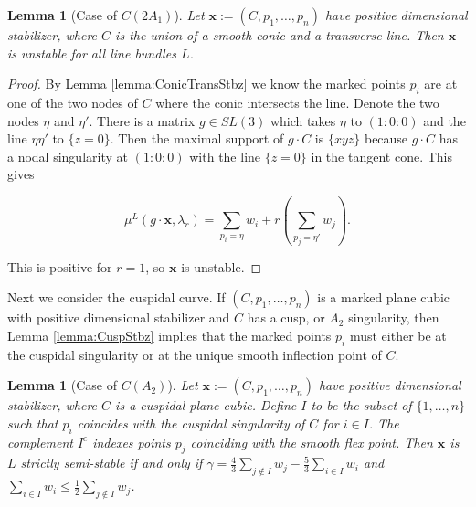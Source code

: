 \documentclass{amsart}
\numberwithin{equation}{section}
\newtheorem{lemma}[prop]{Lemma}
\theoremstyle{definition}
\begin{document}
\begin{lemma}[Case of $C(2A_1)$]\label{Lemma:wallC(2A_1)}
    Let $\mathbf{x} := (C, p_1, \dots , p_n)$ have positive dimensional stabilizer, where $C$ is the union of a smooth conic and a transverse line. Then $\mathbf{x}$ is unstable for all line bundles $L$.
\end{lemma}



\begin{proof}
By Lemma \ref{lemma:ConicTransStbz} we know the marked points $p_i$ are at one of the two nodes of $C$ where the conic intersects the line. Denote the two nodes $\eta$ and $\eta'$. There is a matrix $g \in SL(3)$ which takes $\eta$ to $(1:0:0)$ and the line $\overline{\eta \eta'}$ to $\{z=0\}$. Then the maximal support of $g \cdot C$ is $\{xyz\}$ because $g \cdot C$ has a nodal singularity at $(1:0:0)$ with the line $\{z=0\}$ in the tangent cone. This gives

$$\mu^L(g \cdot \mathbf{x}, \lambda_r) = \sum_{p_i = \eta} w_i + r (\sum_{p_j = \eta'} w_j).$$

This is positive for $r=1$, so $\mathbf{x}$ is unstable.

 \end{proof}


Next we consider the cuspidal curve. If $(C,p_1, \dots , p_n)$ is a marked plane cubic with positive dimensional stabilizer and $C$ has a cusp, or $A_2$ singularity, then Lemma \ref{lemma:CuspStbz} implies that the marked points $p_i$ must either be at the cuspidal singularity or at the unique smooth inflection point of $C$.

\begin{lemma}[Case of $C(A_2)$]\label{Lemma:wallC(A_2)}
    Let $\mathbf{x}:=(C, p_1, \dots , p_n)$ have positive dimensional stabilizer, where $C$ is a cuspidal plane cubic. Define $I$ to be the subset of $\{1, \dots , n\}$ such that $p_i$ coincides with the cuspidal singularity of $C$ for $i \in I$. The complement $I^c$ indexes points $p_j$ coinciding with the smooth flex point. Then $\mathbf{x}$ is $L$ strictly semi-stable if and only if $\gamma= \frac{4}{3} \sum_{j \notin I} w_j - \frac{5}{3} \sum_{i \in I} w_i$ and $\sum_{i \in I} w_i \leq \frac{1}{2}\sum_{j \notin I} w_j$.
\end{lemma}
\end{document}

